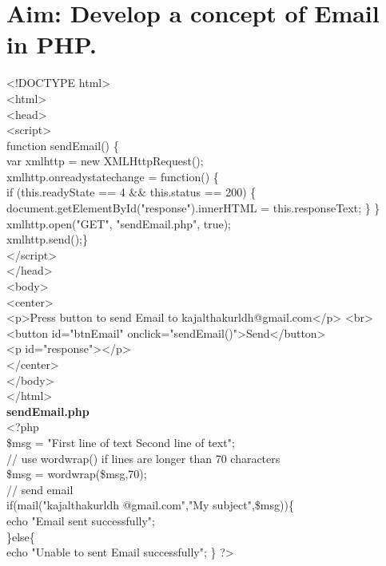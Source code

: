 \section*{\fontsize{16}{14}\selectfont Aim: Develop a concept of Email in PHP.}
<!DOCTYPE html>\\
<html>\\
<head>\\
<script>\\
function sendEmail() \{\\
        var xmlhttp = new XMLHttpRequest();\\
        xmlhttp.onreadystatechange = function() \{\\
            if (this.readyState == 4 \&\& this.status == 200) \{\\
                document.getElementById("response").innerHTML = this.responseText; \} \} \\
        xmlhttp.open("GET", "sendEmail.php", true);\\
        xmlhttp.send();\} \\
    </script>\\
</head>\\
<body>\\
    <center>\\
        <p>Press button to send Email to kajalthakurldh@gmail.com</p> <br>\\
        <button id="btnEmail" onclick="sendEmail()">Send</button>\\
        <p id="response"></p>\\
    </center>\\
</body>\\
</html>\\

\textbf{sendEmail.php}\\
<?php\\
\$msg = "First line of text Second line of text";\\
// use wordwrap() if lines are longer than 70 characters\\
\$msg = wordwrap(\$msg,70);\\
// send email\\
if(mail("kajalthakurldh @gmail.com","My subject",\$msg))\{\\
    echo "Email sent successfully";\\
\}else\{ \\
    echo "Unable to sent Email successfully"; \} ?> 

